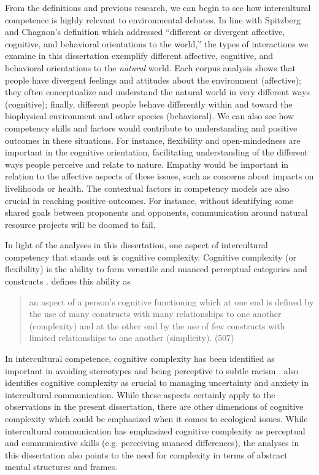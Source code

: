 From the definitions and previous research, we can begin to see how intercultural competence is highly relevant to environmental debates. In line with Spitzberg and Chagnon's definition which addressed ``different or divergent affective, cognitive, and behavioral orientations to the world,'' the types of interactions we examine in this dissertation exemplify different affective, cognitive, and behavioral orientations to the \textit{natural} world. Each corpus analysis shows that people have divergent feelings and attitudes about the environment (affective); they often conceptualize and understand the natural world in very different ways (cognitive); finally, different people behave differently within and toward the biophysical environment and other species (behavioral). We can also see how competency skills and factors would contribute to understanding and positive outcomes in these situations. For instance, flexibility and open-mindedness are important in the cognitive orientation, facilitating understanding of the different ways people perceive and relate to nature. Empathy would be important in relation to the affective aspects of these issues, such as concerns about impacts on livelihoods or health. The contextual factors in competency models are also crucial in reaching positive outcomes. For instance, without identifying some shared goals between proponents and opponents, communication around natural resource projects will be doomed to fail.      

In light of the analyses in this dissertation, one aspect of intercultural competency that stands out is cognitive complexity. Cognitive complexity (or flexibility) is the ability to form versatile and nuanced perceptual categories and constructs \citep{Bieri1955}. \cite*{Pervin1984} defines this ability as 

\begin{quote}
an aspect of a person's cognitive functioning which at one end is defined by the use of many constructs with many relationships to one another (complexity) and at the other end by the use of few constructs with limited relationships to one another (simplicity). (507)
\end{quote} 

In intercultural competence, cognitive complexity has been identified as important in avoiding stereotypes and being perceptive to subtle racism \citep{Read2016}. \cite*{Gudykunst1995} also identifies cognitive complexity as crucial to managing uncertainty and anxiety in intercultural communication. While these aspects certainly apply to the observations in the present dissertation, there are other dimensions of cognitive complexity which could be emphasized when it comes to ecological issues. While intercultural communication has emphasized cognitive complexity as perceptual and communicative skills (e.g. perceiving nuanced differences), the analyses in this dissertation also points to the need for complexity in terms of abstract mental structures and frames. 

